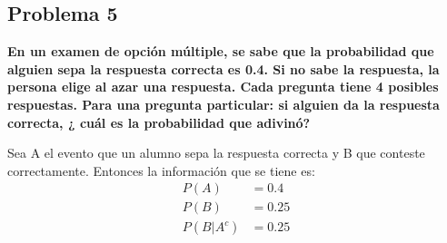 \subsection*{Problema 5}
\textbf{En un examen de opción múltiple, se sabe que la probabilidad que alguien sepa la respuesta correcta es 0.4. Si no sabe la respuesta, la persona elige al azar una respuesta. Cada pregunta tiene 4 posibles respuestas. Para una pregunta particular: si alguien da la respuesta correcta, ¿ cuál es la probabilidad que adivinó?}

Sea A el evento que un alumno sepa la respuesta correcta y B que conteste correctamente. Entonces la información que se tiene es:
\begin{align*}
    P(A)     & = 0.4  \\
    P(B)     & = 0.25 \\
    P(B|A^c) & = 0.25
\end{align*}